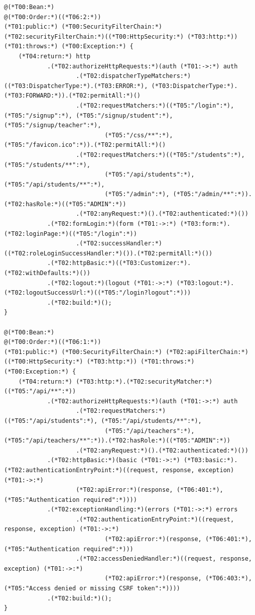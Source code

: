 \begin{lstlisting}[style=vsJava,firstnumber=51]
@(*T00:Bean:*)
@(*T00:Order:*)((*T06:2:*))
(*T01:public:*) (*T00:SecurityFilterChain:*) (*T02:securityFilterChain:*)((*T00:HttpSecurity:*) (*T03:http:*)) (*T01:throws:*) (*T00:Exception:*) {
    (*T04:return:*) http
            .(*T02:authorizeHttpRequests:*)(auth (*T01:->:*) auth
                    .(*T02:dispatcherTypeMatchers:*)((*T03:DispatcherType:*).(*T03:ERROR:*), (*T03:DispatcherType:*).(*T03:FORWARD:*)).(*T02:permitAll:*)()
                    .(*T02:requestMatchers:*)((*T05:"/login":*), (*T05:"/signup":*), (*T05:"/signup/student":*), (*T05:"/signup/teacher":*),
                            (*T05:"/css/**":*), (*T05:"/favicon.ico":*)).(*T02:permitAll:*)()
                    .(*T02:requestMatchers:*)((*T05:"/students":*), (*T05:"/students/**":*),
                            (*T05:"/api/students":*), (*T05:"/api/students/**":*),
                            (*T05:"/admin":*), (*T05:"/admin/**":*)).(*T02:hasRole:*)((*T05:"ADMIN":*))
                    .(*T02:anyRequest:*)().(*T02:authenticated:*)())
            .(*T02:formLogin:*)(form (*T01:->:*) (*T03:form:*).(*T02:loginPage:*)((*T05:"/login":*))
                    .(*T02:successHandler:*)((*T02:roleLoginSuccessHandler:*)()).(*T02:permitAll:*)())
            .(*T02:httpBasic:*)((*T03:Customizer:*).(*T02:withDefaults:*)())
            .(*T02:logout:*)(logout (*T01:->:*) (*T03:logout:*).(*T02:logoutSuccessUrl:*)((*T05:"/login?logout":*)))
            .(*T02:build:*)();
}

@(*T00:Bean:*)
@(*T00:Order:*)((*T06:1:*))
(*T01:public:*) (*T00:SecurityFilterChain:*) (*T02:apiFilterChain:*)((*T00:HttpSecurity:*) (*T03:http:*)) (*T01:throws:*) (*T00:Exception:*) {
    (*T04:return:*) (*T03:http:*).(*T02:securityMatcher:*)((*T05:"/api/**":*))
            .(*T02:authorizeHttpRequests:*)(auth (*T01:->:*) auth
                    .(*T02:requestMatchers:*)((*T05:"/api/students":*), (*T05:"/api/students/**":*),
                            (*T05:"/api/teachers":*), (*T05:"/api/teachers/**":*)).(*T02:hasRole:*)((*T05:"ADMIN":*))
                    .(*T02:anyRequest:*)().(*T02:authenticated:*)())
            .(*T02:httpBasic:*)(basic (*T01:->:*) (*T03:basic:*).(*T02:authenticationEntryPoint:*)((request, response, exception) (*T01:->:*)
                    (*T02:apiError:*)(response, (*T06:401:*), (*T05:"Authentication required":*))))
            .(*T02:exceptionHandling:*)(errors (*T01:->:*) errors
                    .(*T02:authenticationEntryPoint:*)((request, response, exception) (*T01:->:*)
                            (*T02:apiError:*)(response, (*T06:401:*), (*T05:"Authentication required":*)))
                    .(*T02:accessDeniedHandler:*)((request, response, exception) (*T01:->:*)
                            (*T02:apiError:*)(response, (*T06:403:*), (*T05:"Access denied or missing CSRF token":*))))
            .(*T02:build:*)();
}
\end{lstlisting}


